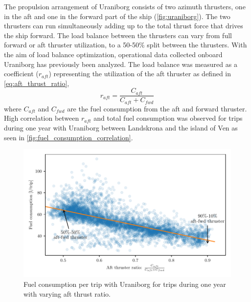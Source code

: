 \documentclass[fleqn,10pt]{olplainarticle}
\begin{document}
The propulsion arrangement of Uraniborg consists of two azimuth thrusters, one in the aft and one in the forward part of the ship (\autoref{fig:uraniborg}). The two thrusters can run simultaneously adding up to the total thrust force that drives the ship forward. The load balance between the thrusters can vary from full forward or aft thruster utilization, to a 50-50\% split between the thrusters. With the aim of load balance optimization, operational data collected onboard Uraniborg has previously been analyzed. The load balance was measured as a coefficient ($r_{aft}$) representing the utilization of the aft thruster as defined in \autoref{eq:aft_thrust_ratio},
\begin{equation}
    r_{aft} = \frac{C_{aft}}{C_{aft} + C_{fwd}}
    \label{eq:aft_thrust_ratio}
\end{equation}
where $C_{aft}$ and $C_{fwd}$ are the fuel consumption from the aft and forward thruster.
High correlation between $r_{aft}$ and total fuel consumption was observed for trips during one year with Uraniborg between Landskrona and the island of Ven as seen in \autoref{fig:fuel_consumption_correlation}.
\begin{figure}[!htb]
    \centering
    \includegraphics[width=\textwidth]{figures/correlation.pdf}
    \caption{Fuel consumption per trip with Uraniborg for trips during one year with varying aft thrust ratio.}
    \label{fig:fuel_consumption_correlation}
\end{figure}
\end{document}

